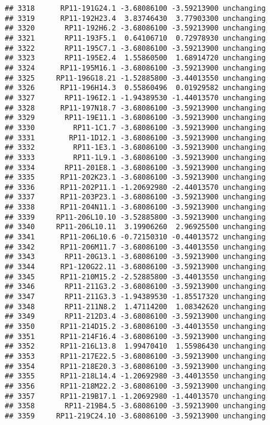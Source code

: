 \documentclass[]{article}
\begin{document}
\begin{verbatim}
## 3318      RP11-191G24.1 -3.68086100 -3.59213900 unchanging
## 3319      RP11-192H23.4  3.83746430  3.77903300 unchanging
## 3320       RP11-192H6.2 -3.68086100 -3.59213900 unchanging
## 3321       RP11-193F5.1  0.64106710  0.72978930 unchanging
## 3322       RP11-195C7.1 -3.68086100 -3.59213900 unchanging
## 3323       RP11-195E2.4  1.55860500  1.68914720 unchanging
## 3324      RP11-195M16.1 -3.68086100 -3.59213900 unchanging
## 3325     RP11-196G18.21 -1.52885800 -3.44013550 unchanging
## 3326      RP11-196H14.3  0.55860496  0.01929582 unchanging
## 3327       RP11-196I2.1 -1.94389530 -1.44013570 unchanging
## 3328      RP11-197N18.7 -3.68086100 -3.59213900 unchanging
## 3329       RP11-19E11.1 -3.68086100 -3.59213900 unchanging
## 3330         RP11-1C1.7 -3.68086100 -3.59213900 unchanging
## 3331        RP11-1D12.1 -3.68086100 -3.59213900 unchanging
## 3332         RP11-1E3.1 -3.68086100 -3.59213900 unchanging
## 3333         RP11-1L9.1 -3.68086100 -3.59213900 unchanging
## 3334       RP11-201E8.1 -3.68086100 -3.59213900 unchanging
## 3335      RP11-202K23.1 -3.68086100 -3.59213900 unchanging
## 3336      RP11-202P11.1 -1.20692980 -2.44013570 unchanging
## 3337      RP11-203P23.1 -3.68086100 -3.59213900 unchanging
## 3338      RP11-204N11.1 -3.68086100 -3.59213900 unchanging
## 3339     RP11-206L10.10 -3.52885800 -3.59213900 unchanging
## 3340     RP11-206L10.11  3.19906260  2.96925500 unchanging
## 3341      RP11-206L10.6 -0.72150310 -0.44013572 unchanging
## 3342      RP11-206M11.7 -3.68086100 -3.44013550 unchanging
## 3343       RP11-20G13.1 -3.68086100 -3.59213900 unchanging
## 3344      RP1-120G22.11 -3.68086100 -3.59213900 unchanging
## 3345      RP11-210M15.2 -2.52885800 -3.44013550 unchanging
## 3346       RP11-211G3.2 -3.68086100 -3.59213900 unchanging
## 3347       RP11-211G3.3 -1.94389530 -1.85517320 unchanging
## 3348       RP11-211N8.2  1.47114200  1.08342620 unchanging
## 3349       RP11-212D3.4 -3.68086100 -3.59213900 unchanging
## 3350      RP11-214D15.2 -3.68086100 -3.44013550 unchanging
## 3351      RP11-214F16.4 -3.68086100 -3.59213900 unchanging
## 3352      RP11-216L13.8  1.99470410  1.55986430 unchanging
## 3353      RP11-217E22.5 -3.68086100 -3.59213900 unchanging
## 3354      RP11-218E20.3 -3.68086100 -3.59213900 unchanging
## 3355      RP11-218L14.4 -1.20692980 -3.44013550 unchanging
## 3356      RP11-218M22.2 -3.68086100 -3.59213900 unchanging
## 3357      RP11-219B17.1 -1.20692980 -1.44013570 unchanging
## 3358       RP11-219B4.5 -3.68086100 -3.59213900 unchanging
## 3359     RP11-219C24.10 -3.68086100 -3.59213900 unchanging

\end{verbatim}
\end{document}

